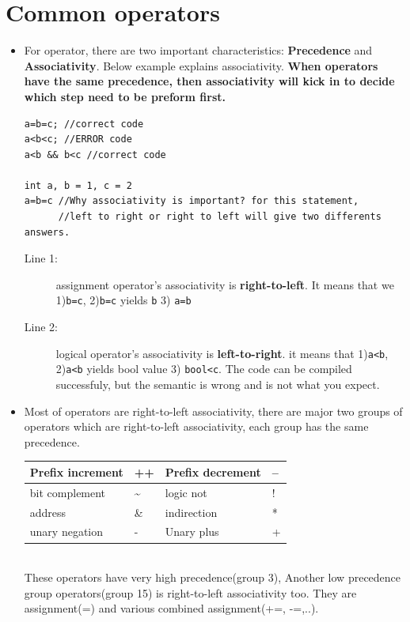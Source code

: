 \documentclass[a4paper,11pt,twoside]{book}
\newcommand{\tophline}{\hline }
\newcommand{\bottomhline}{\\ \hline }
\newcommand{\tophline}{ }
\newcommand{\bottomhline}{ }
\begin{document}
\section{Common operators}

\begin{itemize}
	\item For operator, there are two important characteristics: \textbf{Precedence} and \textbf{Associativity}. Below example explains associativity. \textbf{When operators have the same precedence, then associativity will kick in to decide which step need to be preform first.}
	
\begin{lstlisting}
a=b=c; //correct code
a<b<c; //ERROR code
a<b && b<c //correct code

int a, b = 1, c = 2
a=b=c //Why associativity is important? for this statement, 
      //left to right or right to left will give two differents answers. 
\end{lstlisting}

\begin{description}
	\item[Line 1:] assignment operator's associativity is \textbf{right-to-left}. It means that we 1)\texttt{b=c}, 2)\texttt{b=c} yields \texttt{b} 3) \texttt{a=b} 
	
	\item[Line 2:] logical operator's associativity is \textbf{left-to-right}. it means that 1)\texttt{a<b}, 2)\texttt{a<b} yields bool value 3) \texttt{bool<c}. The code can be compiled successfuly, but the semantic is wrong and is not what you expect.  
\end{description}

    \item Most of operators are right-to-left associativity, there are major two groups of operators which are right-to-left associativity, each group has the same precedence.

\begin{tabular}{|p{}|p{}|p{}|p{}|}
	\tophline
    Prefix increment & ++ & Prefix decrement & --\\
	\tophline
    bit complement & \~{} & logic not & ! \\
	\tophline
    address & \& & indirection & * \\
	\tophline
    unary negation & - & Unary plus & +
	\bottomhline
\end{tabular} \\
These operators have very high precedence(group 3), Another low precedence group operators(group 15) is right-to-left associativity too. They are assignment(=) and various combined assignment(+=, -=,..).


\end{itemize}
\end{document}
